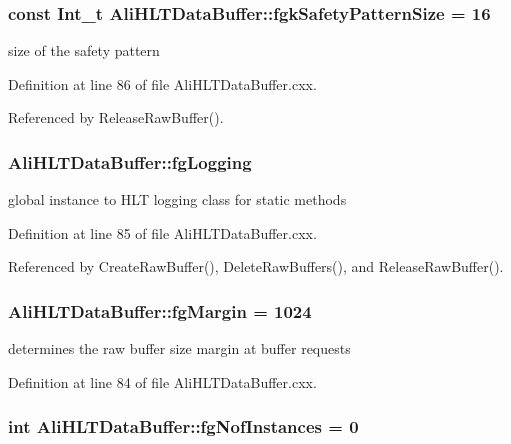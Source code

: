 \subsubsection{\setlength{\rightskip}{0pt plus 5cm}const Int\_\-t {\bf Ali\-HLTData\-Buffer::fgk\-Safety\-Pattern\-Size} = 16\hspace{0.3cm}{\tt  [static, private]}}\label{classAliHLTDataBuffer_v5}


size of the safety pattern 

Definition at line 86 of file Ali\-HLTData\-Buffer.cxx.

Referenced by Release\-Raw\-Buffer().
\subsubsection{ {\bf Ali\-HLTData\-Buffer::fg\-Logging}\hspace{0.3cm}{\tt  [static, private]}}\label{classAliHLTDataBuffer_v4}


global instance to HLT logging class for static methods 

Definition at line 85 of file Ali\-HLTData\-Buffer.cxx.

Referenced by Create\-Raw\-Buffer(), Delete\-Raw\-Buffers(), and Release\-Raw\-Buffer().
\subsubsection{ {\bf Ali\-HLTData\-Buffer::fg\-Margin} = 1024\hspace{0.3cm}{\tt  [static, private]}}\label{classAliHLTDataBuffer_v3}


determines the raw buffer size margin at buffer requests 

Definition at line 84 of file Ali\-HLTData\-Buffer.cxx.
\subsubsection{\setlength{\rightskip}{0pt plus 5cm}int {\bf Ali\-HLTData\-Buffer::fg\-Nof\-Instances} = 0\hspace{0.3cm}{\tt  [static, private]}}\label{classAliHLTDataBuffer_v0}


